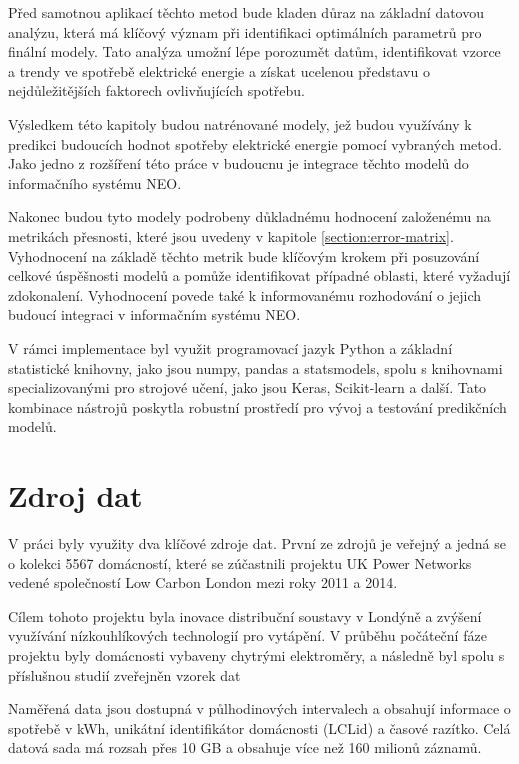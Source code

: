 \documentclass[FM,BP,fonts]{tulthesis}
\begin{document}
Před samotnou aplikací těchto metod bude kladen důraz na základní datovou analýzu, která má klíčový význam při identifikaci optimálních parametrů pro finální modely. Tato analýza umožní lépe porozumět datům, identifikovat vzorce a trendy ve spotřebě elektrické energie a získat ucelenou představu o nejdůležitějších faktorech ovlivňujících spotřebu.

Výsledkem této kapitoly budou natrénované modely, jež budou využívány k predikci budoucích hodnot spotřeby elektrické energie pomocí vybraných metod. Jako jedno z rozšíření této práce v budoucnu je integrace těchto modelů do informačního systému NEO.  

Nakonec budou tyto modely podrobeny důkladnému hodnocení založenému na metrikách přesnosti, které jsou uvedeny v kapitole \ref{section:error-matrix}. Vyhodnocení na základě těchto metrik bude klíčovým krokem při posuzování celkové úspěšnosti modelů a pomůže identifikovat případné oblasti, které vyžadují zdokonalení. Vyhodnocení povede také k informovanému rozhodování o jejich budoucí integraci v informačním systému NEO.

V rámci implementace byl využit programovací jazyk Python a základní statistické knihovny, jako jsou numpy, pandas a statsmodels, spolu s knihovnami specializovanými pro strojové učení, jako jsou Keras, Scikit-learn a další. Tato kombinace nástrojů poskytla robustní prostředí pro vývoj a testování predikčních modelů.

\newpage
\section{Zdroj dat}
V práci byly využity dva klíčové zdroje dat. První ze zdrojů je veřejný a jedná se o kolekci 5567 domácností, které se zúčastnili projektu UK Power Networks vedené společností Low Carbon London mezi roky 2011 a 2014. 

Cílem tohoto projektu byla inovace distribuční soustavy v Londýně a zvýšení využívání nízkouhlíkových technologií pro vytápění. V průběhu počáteční fáze projektu byly domácnosti vybaveny chytrými elektroměry, a následně byl spolu s příslušnou studií zveřejněn vzorek dat \cite{londondata}

Naměřená data jsou dostupná v půlhodinových intervalech a obsahují informace o spotřebě v kWh, unikátní identifikátor domácnosti (LCLid) a časové razítko. Celá datová sada má rozsah přes 10 GB a obsahuje více než 160 milionů záznamů.
\end{document}
